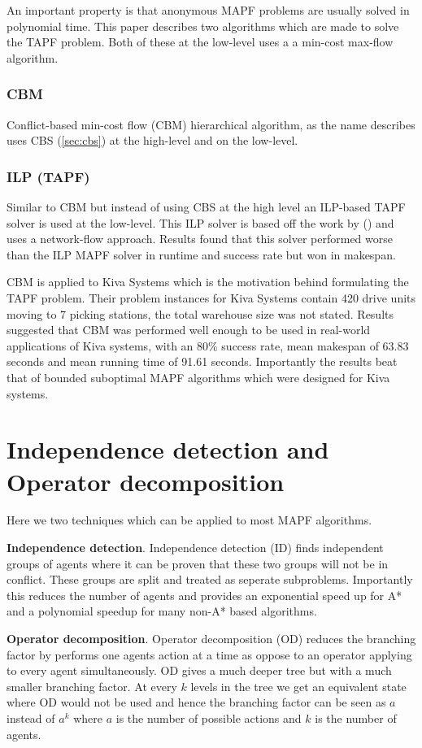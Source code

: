 \documentclass[a4paper,11pt]{article}
\begin{document}
An important property is that anonymous MAPF problems are usually solved in polynomial time. This paper describes two algorithms which are made to solve the TAPF problem. Both of these at the low-level uses a a min-cost max-flow algorithm.

\subsubsection{CBM}
Conflict-based min-cost flow (CBM)  hierarchical algorithm, as the name describes uses CBS (\ref{sec:cbs}) at the high-level and  on the low-level.

\subsubsection{ILP (TAPF)}
Similar to CBM but instead of using CBS at the high level an ILP-based TAPF solver is used at the low-level. This ILP solver is based off the work by (\cite{yu2013multi}) and uses a network-flow approach. Results found that this solver performed worse than the ILP MAPF solver in runtime and success rate but won in makespan.

CBM is applied to Kiva Systems which is the motivation behind formulating the TAPF problem. Their problem instances for Kiva Systems contain 420 drive units moving to 7 picking stations, the total warehouse size was not stated. Results suggested that CBM was performed well enough to be used in real-world applications of Kiva systems, with an 80\% success rate, mean makespan of 63.83 seconds and mean running time of 91.61 seconds. Importantly the results beat that of bounded suboptimal MAPF algorithms which were designed for Kiva systems.

\section{Independence detection and Operator decomposition} \label{sec:generalimprovements}
Here we two techniques which can be applied to most MAPF algorithms.

\textbf{Independence detection}. Independence detection (ID) finds independent groups of agents where it can be proven that these two groups will not be in conflict. These groups are split and treated as seperate subproblems. Importantly this reduces the number of agents and provides an exponential speed up for A* and a polynomial speedup for many non-A* based algorithms.

\textbf{Operator decomposition}. Operator decomposition (OD) reduces the branching factor by performs one agents action at a time as oppose to an operator applying to every agent simultaneously. OD gives a much deeper tree but with a much smaller branching factor. At every $k$ levels in the tree we get an equivalent state where OD would not be used and hence the branching factor can be seen as $a$ instead of $a^k$ where $a$ is the number of possible actions and $k$ is the number of agents.
\end{document}
